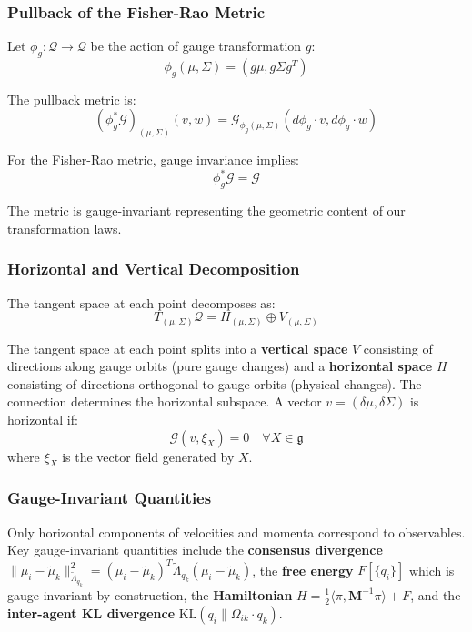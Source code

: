 \documentclass[12pt]{article}
\begin{document}
\subsubsection{Pullback of the Fisher-Rao Metric}

Let $\phi_g: \mathcal{Q} \to \mathcal{Q}$ be the action of gauge transformation $g$:
\begin{equation}
\phi_g(\mu, \Sigma) = (g\mu, g\Sigma g^T)
\end{equation}

The pullback metric is:
\begin{equation}
(\phi_g^*\mathcal{G})_{(\mu,\Sigma)}(v, w) = \mathcal{G}_{\phi_g(\mu,\Sigma)}(d\phi_g \cdot v, d\phi_g \cdot w)
\end{equation}

For the Fisher-Rao metric, gauge invariance implies:
\begin{equation}
\boxed{\phi_g^*\mathcal{G} = \mathcal{G}}
\end{equation}

The metric is gauge-invariant representing the geometric content of our transformation laws.

\subsubsection{Horizontal and Vertical Decomposition}

The tangent space at each point decomposes as:
\begin{equation}
T_{(\mu,\Sigma)}\mathcal{Q} = H_{(\mu,\Sigma)} \oplus V_{(\mu,\Sigma)}
\end{equation}

The tangent space at each point splits into a \textbf{vertical space} $V$ consisting of directions along gauge orbits (pure gauge changes) and a \textbf{horizontal space} $H$ consisting of directions orthogonal to gauge orbits (physical changes). The connection determines the horizontal subspace. A vector $v = (\delta\mu, \delta\Sigma)$ is horizontal if:
\begin{equation}
\mathcal{G}(v, \xi_X) = 0 \quad \forall X \in \mathfrak{g}
\end{equation}
where $\xi_X$ is the vector field generated by $X$.

\subsubsection{Gauge-Invariant Quantities}

Only horizontal components of velocities and momenta correspond to observables. Key gauge-invariant quantities include the \textbf{consensus divergence} $\|\mu_i - \tilde{\mu}_k\|_{\tilde{\Lambda}_{q_k}}^2 = (\mu_i - \tilde{\mu}_k)^T\tilde{\Lambda}_{q_k}(\mu_i - \tilde{\mu}_k)$, the \textbf{free energy} $F[\{q_i\}]$ which is gauge-invariant by construction, the \textbf{Hamiltonian} $H = \frac{1}{2}\langle\pi, \mathbf{M}^{-1}\pi\rangle + F$, and the \textbf{inter-agent KL divergence} $\mathrm{KL}(q_i \| \Omega_{ik}\cdot q_k)$.
\end{document}

